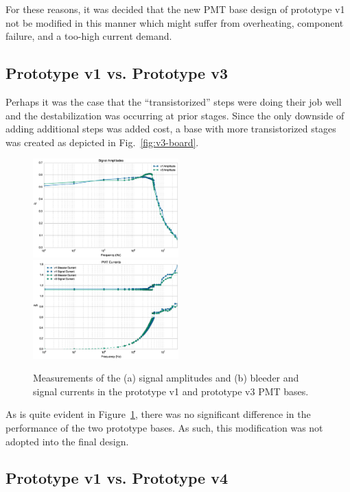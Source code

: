 For these reasons, it was decided that the new PMT base design of prototype v1 not be modified in this manner which might suffer from overheating, component failure, and a too-high current demand.

\subsection{Prototype v1 vs. Prototype v3}

Perhaps it was the case that the ``transistorized'' steps were doing their job well and the destabilization was occurring at prior stages. Since the only downside of adding additional steps was added cost, a base with more transistorized stages was created as depicted in Fig.~\ref{fig:v3-board}.

\begin{figure}[h]
	\centerline{
		\mbox{\includegraphics[width=0.5\textwidth]{figures/Test_v3_Amp.eps} \includegraphics[width=0.5\textwidth]{figures/Test_v3_Current.eps}}}
	\caption{Measurements of the (a) signal amplitudes and (b) bleeder and signal currents in the prototype v1 and prototype v3 PMT bases.}
	\label{fig:test-v3}
\end{figure}

As is quite evident in Figure~\ref{fig:test-v3}, there was no significant difference in the performance of the two prototype bases. As such, this modification was not adopted into the final design.

\subsection{Prototype v1 vs. Prototype v4}

